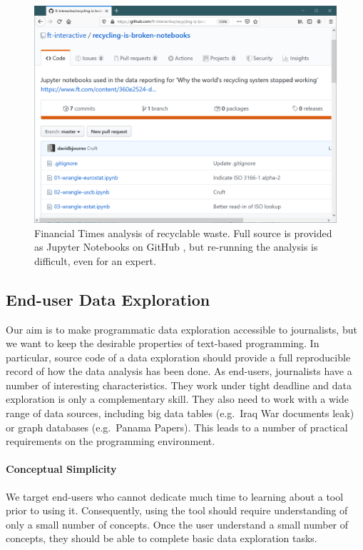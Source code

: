 \documentclass{sigchi}
\begin{document}
\begin{figure}
\includegraphics[width=1\columnwidth]{figures/ft}
\caption{Financial Times analysis of recyclable waste. Full source is provided as Jupyter Notebooks
on GitHub \cite{ftnotebooks}, but re-running the analysis is difficult, even for an expert.}
\label{fig:ft}
\end{figure}

\subsection{End-user Data Exploration}
Our aim is to make programmatic data exploration accessible to journalists, but we want to keep
the desirable properties of text-based programming. In particular, source code of a data
exploration should provide a full reproducible record of how the data analysis has been done.
As end-users, journalists have a number of interesting characteristics. They work under tight
deadline and data exploration is only a complementary skill. They also need to work with a wide
range of data sources, including big data tables (e.g.~Iraq War documents leak) or graph
databases (e.g.~Panama Papers). This leads to a number of practical requirements on the programming
environment.

\paragraph{Conceptual Simplicity}
We target end-users who cannot dedicate much time to learning about a tool prior
to using it. Consequently, using the tool should require understanding of only a small number
of concepts. Once the user understand a small number of concepts, they should be able to complete
basic data exploration tasks.
\end{document}
